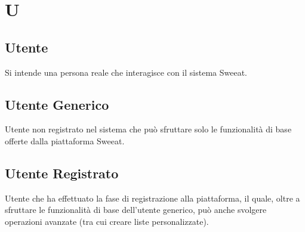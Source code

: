 \section{U}

\subsection{Utente} Si intende una persona reale che interagisce con il sistema Sweeat.

\subsection{Utente Generico} Utente non registrato nel sistema che può sfruttare solo le funzionalità di base offerte dalla piattaforma Sweeat.

\subsection{Utente Registrato} Utente che ha effettuato la fase di registrazione alla piattaforma, il quale, oltre a sfruttare le funzionalità di base dell’utente generico, può anche svolgere operazioni avanzate (tra cui creare liste personalizzate).

\clearpage